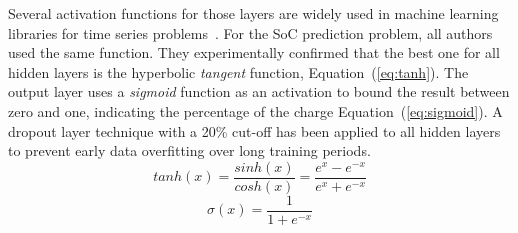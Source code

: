 
%
Several activation functions for those layers are widely used in machine learning libraries for time series problems~\cite{amidi_cs_2018}.
For the SoC prediction problem, all authors used the same function.
They experimentally confirmed that the best one for all hidden layers is the hyperbolic \textit{tangent} function, \mbox{Equation~(\ref{eq:tanh})}.
The output layer uses a \textit{sigmoid} function as an activation to bound the result between zero and one, indicating the percentage of the charge \mbox{Equation~(\ref{eq:sigmoid})}.
A dropout layer technique with a 20\% cut-off has been applied to all hidden layers to prevent early data overfitting over long training periods.
\begin{equation}
    tanh(x) = \frac{sinh(x)}{cosh(x)}=\frac{e^x-e^{-x}}{e^x+e^{-x}}
    \label{eq:tanh}
\end{equation}
\begin{equation}
    \sigma(x) = \frac{1}{1+e^{-x}}
    \label{eq:sigmoid}
\end{equation}
%
%

